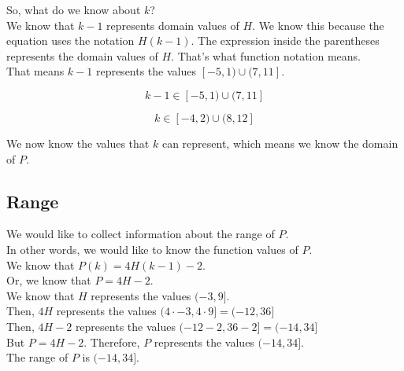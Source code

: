 \documentclass{ximera}
\begin{document}
So, what do we know about $k$? \\


We know that $k-1$ represents domain values of $H$.  We know this because the equation uses the notation $H(k-1)$.  The expression inside the parentheses represents the domain values of $H$.  That's what function notation means. \\


That means $k-1$ represents the values  $[-5, 1) \cup (7, 11]$.


\[
k - 1 \in [-5, 1) \cup (7, 11]
\]


\[
k \in [-4, 2) \cup (8, 12]
\]



We now know the values that $k$ can represent, which means we know the domain of $P$. \\












\subsection*{Range}


We would like to collect information about the range of $P$. \\

In other words, we would like to know the function values of $P$. \\ 


We know that $P(k) = 4 H(k-1) - 2$.\\


Or, we know that $P = 4 H - 2$. \\



We know that $H$ represents the values $(-3, 9]$. \\


Then, $4 H$ represents the values $(4 \cdot -3, 4 \cdot 9] = (-12, 36]$ \\



Then, $4 H - 2$ represents the values $(-12 - 2, 36 - 2] = (-14, 34]$ \\


But $P = 4 H - 2$.  Therefore, $P$ represents the values $(-14, 34]$. \\


The range of $P$ is $(-14, 34]$.
\end{document}
